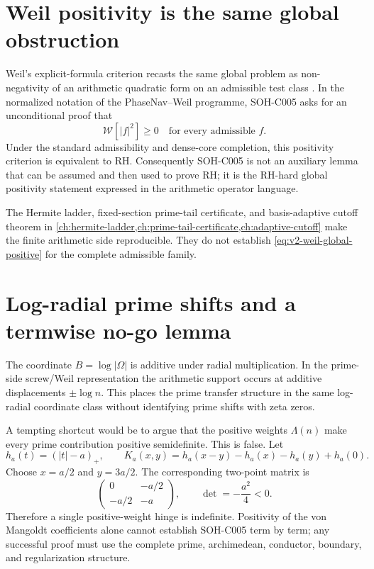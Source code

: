 \section{Weil positivity is the same global obstruction}

Weil's explicit-formula criterion recasts the same global problem as non-negativity of an arithmetic quadratic form on an admissible test class \citep{weil1952}. In the normalized notation of the PhaseNav--Weil programme, SOH-C005 asks for an unconditional proof that
\begin{equation}
 \boxed{\mathcal W[|f|^2]\ge0
 \quad\text{for every admissible }f.}
 \label{eq:v2-weil-global-positive}
\end{equation}
Under the standard admissibility and dense-core completion, this positivity criterion is equivalent to RH. Consequently SOH-C005 is not an auxiliary lemma that can be assumed and then used to prove RH; it is the RH-hard global positivity statement expressed in the arithmetic operator language.

The Hermite ladder, fixed-section prime-tail certificate, and basis-adaptive cutoff theorem in \cref{ch:hermite-ladder,ch:prime-tail-certificate,ch:adaptive-cutoff} make the finite arithmetic side reproducible. They do not establish \cref{eq:v2-weil-global-positive} for the complete admissible family.

\section{Log-radial prime shifts and a termwise no-go lemma}

The coordinate $B=\log|\Omega|$ is additive under radial multiplication. In the prime-side screw/Weil representation the arithmetic support occurs at additive displacements $\pm\log n$. This places the prime transfer structure in the same log-radial coordinate class without identifying prime shifts with zeta zeros.

A tempting shortcut would be to argue that the positive weights $\Lambda(n)$ make every prime contribution positive semidefinite. This is false. Let
\begin{equation}
 h_a(t)=(|t|-a)_+,
 \qquad
 K_a(x,y)=h_a(x-y)-h_a(x)-h_a(y)+h_a(0).
 \label{eq:v2-hinge-kernel}
\end{equation}
Choose $x=a/2$ and $y=3a/2$. The corresponding two-point matrix is
\begin{equation}
 \begin{pmatrix}
 0&-a/2\\
 -a/2&-a
 \end{pmatrix},
 \qquad
 \det=-\frac{a^2}{4}<0.
 \label{eq:v2-hinge-indefinite}
\end{equation}
Therefore a single positive-weight hinge is indefinite. Positivity of the von Mangoldt coefficients alone cannot establish SOH-C005 term by term; any successful proof must use the complete prime, archimedean, conductor, boundary, and regularization structure.

